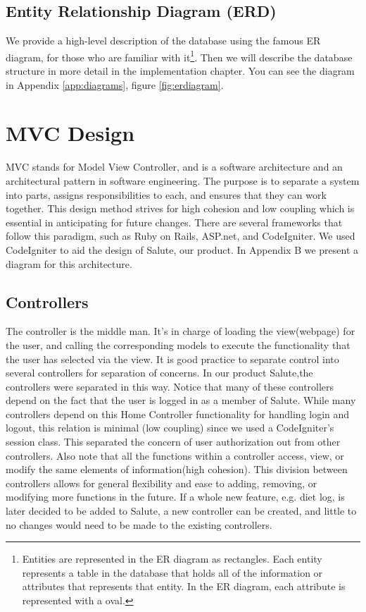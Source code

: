 \documentclass[10pt]{report}
\begin{document}
\subsection{Entity Relationship Diagram (ERD)}
We provide a high-level description of the database using the famous ER diagram, for those who are familiar with it\footnote{Entities are represented in the ER diagram as rectangles.  Each entity represents a table in the database that holds all of the information or attributes that represents that entity.  In the ER diagram, each attribute is represented with a oval.}. Then we will describe the database structure in more detail in the implementation chapter. You can see the diagram in Appendix \ref{app:diagrams}, figure \ref{fig:erdiagram}.


\section{MVC Design}

MVC stands for Model View Controller, and is a software architecture and an architectural pattern in software engineering. The purpose is to separate a system into parts, assigns responsibilities to each, and ensures that they can work together. This design method strives for high cohesion and low coupling which is essential in anticipating for future changes. There are several frameworks that follow this paradigm, such as Ruby on Rails, ASP.net, and CodeIgniter. We used CodeIgniter to aid the design of Salute, our product.  In Appendix B we present a diagram for this architecture.


\subsection{Controllers}

The controller is the middle man. It's in charge of loading the view(webpage) for the user, and calling the corresponding models to execute the functionality that the user has selected via the view. 
It is good practice to separate control into several controllers for separation of concerns. In our product Salute,the controllers were separated in this way. Notice that many of these controllers depend on the fact that the user is logged in as a member of Salute. While many controllers depend on this Home Controller functionality for handling login and logout, this relation is minimal (low coupling) since we used a CodeIgniter's session class. This separated the concern of user authorization out from other controllers. 
Also note that all the functions within a controller access, view, or modify the same elements of information(high cohesion). This division between controllers allows for general flexibility and ease to adding, removing, or modifying more functions in the future. If a whole new feature, e.g. diet log, is later decided to be added to Salute, a new controller can be created, and little to no changes would need to be made to the existing controllers. 
\end{document}
